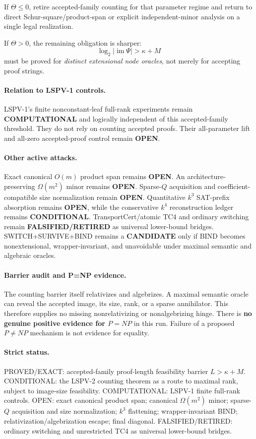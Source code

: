 \documentclass[11pt]{article}
\begin{document}
If $\Theta\le0$, retire accepted-family counting for that parameter regime and return to direct Schur-square/product-span or explicit independent-minor analysis on a single legal realization.

If $\Theta>0$, the remaining obligation is sharper:
\[
\log_2|\operatorname{im}\Psi|>\kappa+M
\]
must be proved for \emph{distinct extensional node oracles}, not merely for accepting proof strings.

\paragraph{Relation to LSPV-1 controls.}
LSPV-1's finite nonconstant-leaf full-rank experiments remain \textbf{COMPUTATIONAL} and logically independent of this accepted-family threshold. They do not rely on counting accepted proofs. Their all-parameter lift and all-zero accepted-proof control remain \textbf{OPEN}.

\paragraph{Other active attacks.}
Exact canonical $O(m)$ product span remains \textbf{OPEN}. An architecture-preserving $\Omega(m^2)$ minor remains \textbf{OPEN}. Sparse-$Q$ acquisition and coefficient-compatible size normalization remain \textbf{OPEN}. Quantitative $k^3$ SAT-prefix absorption remains \textbf{OPEN}, while the conservative $k^4$ reconstruction ledger remains \textbf{CONDITIONAL}. TransportCert/atomic TC4 and ordinary switching remain \textbf{FALSIFIED/RETIRED} as universal lower-bound bridges. SWITCH+SURVIVE+BIND remains a \textbf{CANDIDATE} only if BIND becomes nonextensional, wrapper-invariant, and unavoidable under maximal semantic and algebraic oracles.

\paragraph{Barrier audit and P=NP evidence.}
The counting barrier itself relativizes and algebrizes. A maximal semantic oracle can reveal the accepted image, its size, rank, or a sparse annihilator. This therefore supplies no missing nonrelativizing or nonalgebrizing hinge. There is \textbf{no genuine positive evidence for $P=NP$} in this run. Failure of a proposed $P\ne NP$ mechanism is not evidence for equality.

\paragraph{Strict status.}
PROVED/EXACT: accepted-family proof-length feasibility barrier $L>\kappa+M$.
CONDITIONAL: the LSPV-2 counting theorem as a route to maximal rank, subject to image-size feasibility.
COMPUTATIONAL: LSPV-1 finite full-rank controls.
OPEN: exact canonical product span; canonical $\Omega(m^2)$ minor; sparse-$Q$ acquisition and size normalization; $k^3$ flattening; wrapper-invariant BIND; relativization/algebrization escape; final diagonal.
FALSIFIED/RETIRED: ordinary switching and unrestricted TC4 as universal lower-bound bridges.
\end{document}
